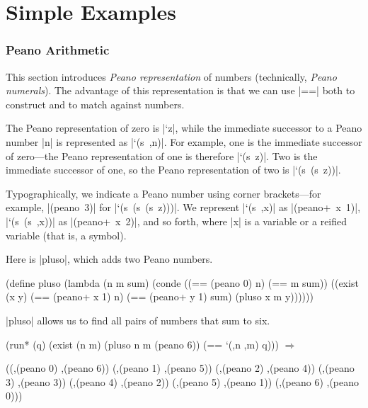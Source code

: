 \chapter{Simple Examples}\label{simpleexampleschapter}

\subsection{Peano Arithmetic}\label{peanosection}

This section introduces \emph{Peano representation} of numbers (technically, \emph{Peano numerals}).  The advantage of this representation is that we can use \scheme|==| both to construct and to match against numbers.

The Peano representation of zero is \scheme|`z|, while the immediate successor to a Peano number \mbox{\scheme|n|} is represented as \mbox{\scheme|`(s ,n)|}.  For example, one is the immediate successor of zero---the Peano representation of one is therefore \mbox{\scheme|`(s z)|}.  Two is the immediate successor of one, so the Peano representation of two is \mbox{\scheme|`(s (s z))|}.

Typographically, we indicate a Peano number using corner brackets---for example, \mbox{\scheme|(peano 3)|} for \mbox{\scheme|`(s (s (s z)))|}. We represent \mbox{\scheme|`(s ,x)|} as \mbox{\scheme|(peano+ x 1)|}, \mbox{\scheme|`(s (s ,x))|} as \mbox{\scheme|(peano+ x 2)|}, and so forth, where \scheme|x| is a variable or a reified variable (that is, a symbol).  


Here is \scheme|pluso|, which adds two Peano numbers.

\begin{schemedisplay}
(define pluso
  (lambda (n m sum)
    (conde
      ((== (peano 0) n) (== m sum))
      ((exist (x y)
         (== (peano+ x 1) n)
         (== (peano+ y 1) sum)
         (pluso x m y))))))
\end{schemedisplay}

\newpage
\noindent \scheme|pluso| allows us to find all pairs of numbers that sum to six.

\begin{schemedisplay}
(run* (q)
  (exist (n m)
    (pluso n m (peano 6))
    (== `(,n ,m) q))) $\Rightarrow$
\end{schemedisplay}
\nspace
\begin{schemeresponse}
((,(peano 0) ,(peano 6))
 (,(peano 1) ,(peano 5))
 (,(peano 2) ,(peano 4))
 (,(peano 3) ,(peano 3))
 (,(peano 4) ,(peano 2))
 (,(peano 5) ,(peano 1))
 (,(peano 6) ,(peano 0)))
\end{schemeresponse}

